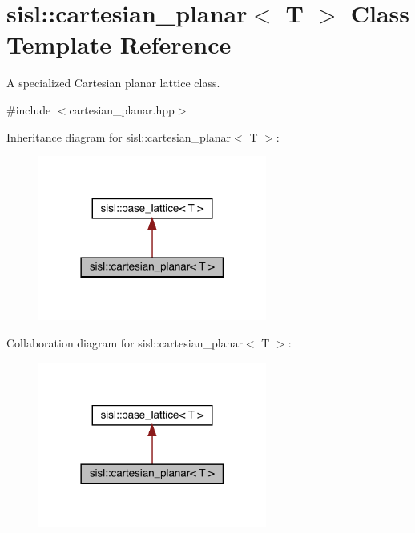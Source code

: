 \hypertarget{classsisl_1_1cartesian__planar}{}\section{sisl\+:\+:cartesian\+\_\+planar$<$ T $>$ Class Template Reference}
\label{classsisl_1_1cartesian__planar}


A specialized Cartesian planar lattice class.  




{\ttfamily \#include $<$cartesian\+\_\+planar.\+hpp$>$}



Inheritance diagram for sisl\+:\+:cartesian\+\_\+planar$<$ T $>$\+:\nopagebreak
\begin{figure}[H]
\begin{center}
\leavevmode
\includegraphics[width=213pt]{classsisl_1_1cartesian__planar__inherit__graph}
\end{center}
\end{figure}


Collaboration diagram for sisl\+:\+:cartesian\+\_\+planar$<$ T $>$\+:\nopagebreak
\begin{figure}[H]
\begin{center}
\leavevmode
\includegraphics[width=213pt]{classsisl_1_1cartesian__planar__coll__graph}
\end{center}
\end{figure}
